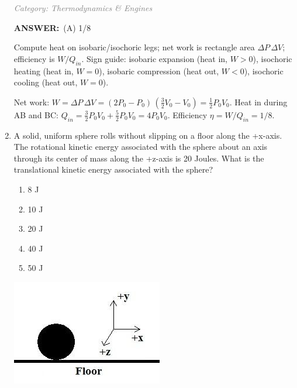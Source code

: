 ﻿\documentclass[12pt, a4paper]{article}
\makeatletter
\newcommand{\finalanswer}[1]{\textbf{ANSWER:}~#1}
\newif\if@categoryprinted
\newcommand{\category}[1]{\if@categoryprinted\relax\else\textit{\textcolor{gray}{Category: #1}}\global\@categoryprintedtrue\fi}
\newcommand{\tags}[1]{}
\makeatother
\begin{document}
\begin{CJK*}{UTF8}{gbsn}
\begin{enumerate}[itemsep=1.0em, topsep=0.6em]
\category{Thermodynamics \& Engines} \tags{}
\begin{answerbox}
\finalanswer{(A) 1/8}
\end{answerbox}
\begin{insightbox}
Compute heat on isobaric/isochoric legs; net work is rectangle area $\Delta P\,\Delta V$; efficiency is $W/Q_{in}$. Sign guide: isobaric expansion (heat in, $W>0$), isochoric heating (heat in, $W=0$), isobaric compression (heat out, $W<0$), isochoric cooling (heat out, $W=0$).
\end{insightbox}
\begin{solutionbox}

Net work: $W=\Delta P\,\Delta V= (2P_0-P_0)\,(\tfrac{3}{2}V_0-V_0)=\tfrac{1}{2}P_0V_0$. Heat in during AB and BC: $Q_{in}=\tfrac{3}{2}P_0V_0+\tfrac{5}{2}P_0V_0=4P_0V_0$. Efficiency $\eta=W/Q_{in}=1/8$.
\end{solutionbox}

\item \label{prob:20}
\noindent\begin{minipage}[t]{0.6\linewidth}
\vspace{0pt}
A solid, uniform sphere rolls without slipping on a floor along the +x-axis. The rotational kinetic energy associated with the sphere about an axis through its center of mass along the +z-axis is 20 Joules. What is the translational kinetic energy associated with the sphere?
\begin{enumerate}[label=(\Alph*)]
    \item 8 J
    \item 10 J
    \item 20 J
    \item 40 J
    \item 50 J
\end{enumerate}
\end{minipage}%
\hfill
\begin{minipage}[t]{0.32\linewidth}
\vspace{0pt}
\centering
\includegraphics[width=\linewidth]{Problem_20_Figure.png}
\end{minipage}


\end{enumerate}
\end{CJK*}
\end{document}
